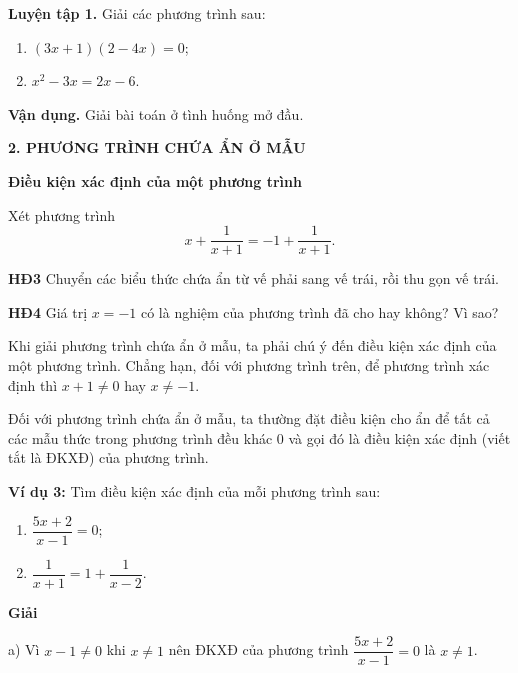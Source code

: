 \begin{lesson}
    \textbf{Luyện tập 1.} Giải các phương trình sau:
    \begin{enumerate}[label=\alph*)]
        \item $(3x+1)(2-4x)=0$;

        \answerline
        \answerline
        \item $x^2-3x=2x-6$.

        \answerline
        \answerline
    \end{enumerate}

    \textbf{Vận dụng.} Giải bài toán ở tình huống mở đầu.

    \answerline
    \answerline
    \answerline

    \textbf{2. PHƯƠNG TRÌNH CHỨA ẨN Ở MẪU}

    \textbf{Điều kiện xác định của một phương trình}

    Xét phương trình
    \[
        x+\dfrac{1}{x+1}=-1+\dfrac{1}{x+1}. \tag{1}
    \]

    \textbf{HĐ3} Chuyển các biểu thức chứa ẩn từ vế phải sang vế trái, rồi thu gọn vế trái.

    \answerline
    \answerline

    \textbf{HĐ4} Giá trị $x=-1$ có là nghiệm của phương trình đã cho hay không? Vì sao?

    \answerline
    \answerline

    Khi giải phương trình chứa ẩn ở mẫu, ta phải chú ý đến điều kiện xác định của một phương trình. Chẳng hạn, đối với phương trình trên, để phương trình xác định thì $x+1\ne0$ hay $x\ne-1$.

    \begin{keyconcept}
        Đối với phương trình chứa ẩn ở mẫu, ta thường đặt điều kiện cho ẩn để tất cả các mẫu thức trong phương trình đều khác 0 và gọi đó là điều kiện xác định (viết tắt là ĐKXĐ) của phương trình.
    \end{keyconcept}

    \textbf{Ví dụ 3:} Tìm điều kiện xác định của mỗi phương trình sau:
    \begin{enumerate}[label=\alph*)]
        \item $\dfrac{5x+2}{x-1}=0$;
        \item $\dfrac{1}{x+1}=1+\dfrac{1}{x-2}$.
    \end{enumerate}

    \textbf{Giải}

    a) Vì $x-1\ne0$ khi $x\ne1$ nên ĐKXĐ của phương trình $\dfrac{5x+2}{x-1}=0$ là $x\ne1$.


\end{lesson}

